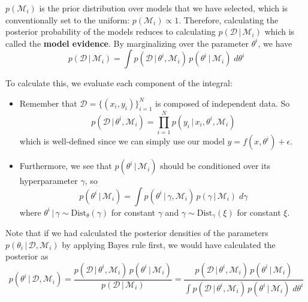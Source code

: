   $p(\mathcal{M}_i)$ is the prior distribution over models that we have selected, which is conventionally set to the uniform: $p(\mathcal{M}_i) \propto 1$. Therefore, calculating the posterior probability of the models reduces to calculating $p(\mathcal{D}\,|\,\mathcal{M}_i)$ which is called the \textbf{model evidence}. By marginalizing over the parameter $\theta^i$, we have
  \begin{equation}
    p(\mathcal{D}\,|\,\mathcal{M}_i) = \int p(\mathcal{D}\,|\,\theta^i, \mathcal{M}_i) \, p(\theta^i\,|\,\mathcal{M}_i)\; d\theta^i
  \end{equation}

  To calculate this, we evaluate each component of the integral:
  \begin{itemize}
    \item Remember that $\mathcal{D} = \{(x_i, y_i)\}_{i=1}^N$ is composed of independent data. So
    \begin{equation}
      p(\mathcal{D}\,|\,\theta^i, \mathcal{M}_i) = \prod_{i=1}^N p(y_i \,|\, x_i, \theta^i, \mathcal{M}_i)
    \end{equation}
    which is well-defined since we can simply use our model $y = f (x, \theta^i) + \epsilon$.

    \item Furthermore, we see that $p(\theta^i \,|\,\mathcal{M}_i)$ should be conditioned over its hyperparameter $\gamma$, so
    \begin{equation}
      p(\theta^i \,|\,\mathcal{M}_i) = \int p(\theta^i \,|\,\gamma, \mathcal{M}_i) \, p(\gamma\,|\,\mathcal{M}_i)\; d\gamma
    \end{equation}
    where $\theta^i \,|\,\gamma \sim \text{Dist}_\theta (\gamma)$ for constant $\gamma$ and $\gamma \sim \text{Dist}_\gamma (\xi)$ for constant $\xi$.
  \end{itemize}

  Note that if we had calculated the posterior densities of the parameters $p(\theta_i\,|\,\mathcal{D}, \mathcal{M}_i)$ by applying Bayes rule first, we would have calculated the posterior as
  \begin{equation}
    p(\theta^i\,|\,\mathcal{D}, \mathcal{M}_i) = \frac{p(\mathcal{D}\,|\,\theta^i, \mathcal{M}_i)\, p(\theta^i \,|\,\mathcal{M}_i)}{p(\mathcal{D}\,|\,\mathcal{M}_i)} = \frac{p(\mathcal{D}\,|\,\theta^i, \mathcal{M}_i)\, p(\theta^i \,|\,\mathcal{M}_i)}{\int p(\mathcal{D}\,|\,\theta^i, \mathcal{M}_i)\, p(\theta^i \,|\,\mathcal{M}_i)\; d\theta^i}
  \end{equation}

